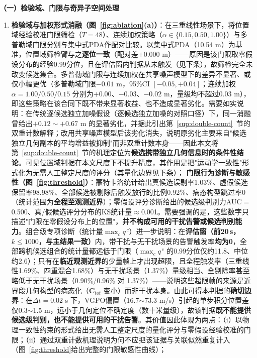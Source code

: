 \documentclass[UTF8,a4paper,zihao=-4]{ctexart}
\begin{document}
\noindent\textbf{（一）检验域、门限与奇异子空间处理}\par
\begin{enumerate}
\item \textbf{检验域与加权形式消融（图~\ref{fig:ablation}(a)）}：在三重线性场景下，将位置域经验校准门限筛检（$T=48$）、连续加权策略（$\alpha\in\{0.15,0.50,1.00\}$）与多普勒域门限分别与集中式PDA作配对比较。以集中式PDA（10.54 m）为基准，位置域筛检臂与之\textbf{逐位一致}（配对差$+0.000$ m）——原因是该门限取零假设分布的经验0.99分位，且在评估窗内判据从未触发（见下条），故筛检完全未改变候选集合。多普勒域门限与连续加权在共享噪声模型下的差异不显著、或仅小幅更优（多普勒域门限$-0.01$ m，95\%CI $[-0.05,+0.04]$；连续加权$\alpha=1.00/0.50/0.15$ 分别为$+0.00$、$-0.03$、$-0.02$ m，量级均不超过0.03 m），即这些策略在该合同下既不带来显著收益、也不造成显著劣化。需要如实说明：在传统逐候选独立加噪假设（逐候选独立加噪的对照口径）下，同一消融曾给出$+0.12\sim+0.67$ m 的显著劣化，并据此引出第~\ref{sup:double-count}~节的双重计数解释；改用共享噪声模型后该劣化消失，说明原劣化主要来自"候选独立几何副本的平均增益被抑制"而非双重计数本身——因此本文将第~\ref{sup:double-count}~节的机理定位为\textbf{候选携带独立几何信息时的条件性结论}。可见位置域判据在本文尺度下不提升精度，其作用是把"运动学一致性"形式化为无需人工整定尺度的评分（其量化边界见下条）； \textbf{门限行为诊断与敏感性（图~\ref{fig:threshold}）}：蒙特卡洛统计给出真候选误剔率1.03\%、虚假候选保留率98.98\%、全部候选被剔除后触发放行的比例0.92\%、病态构型跳过率0（统计范围为\textbf{全程至观测近界}）；零假设评分诊断给出的候选级判别力AUC$=$0.500、真/假候选评分分布的KS统计量$\approx$0.001。需要强调的是，这些数字只描述"门限在零假设分布上的位置"，\textbf{并不构成可用的干扰告警或候选判别能力}。组合级专项诊断（统计量\(\max_c q^{\,c}\)）进一步说明：在\textbf{评估窗（前20\,s，\(k\le1000\)，与主结果一致）}内，带干扰与无干扰场景的告警触发率\textbf{均为0}，全部跨机候选组合的统计量都远低于门限（\(\max_c q^{\,c}\) 的0.99分位仅约11.8、中位约2.6）；只有在\textbf{临近观测近界}的少量帧上才出现超限，且全程触发率（三重线性1.69\%、四重混合1.68\%）与无干扰场景（1.37\%）量级相当、全剔除率甚至略低于无干扰场景（0.90\%/0.96\% 对 1.37\%）——说明这些超限帧的来源是近界段几何构型的病态化（\(\boldsymbol{C}_{tot}\) 变小）而非干扰本身。由此可得本判据的\textbf{确切边界}：在\(\Delta t=0.02\) s 下，VGPO偏置（16.7$\sim$73.3 m/s）引起的单步积分位置差仅0.3$\sim$1.5 m，远小于几何定位不确定度（数十米量级），故该判据\textbf{既不能提供候选级判别，也不能提供可用的干扰告警}。其价值因此体现为两点：（i）以物理一致性约束的形式给出无需人工整定尺度的量化评分与零假设经验校准的门限；（ii）通过双重计数机理说明为何不应把该证据与关联似然重复计入（图~\ref{fig:threshold}给出完整的门限敏感性曲线）；


\end{enumerate}
\end{document}
